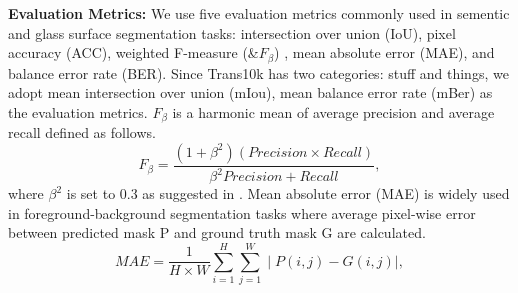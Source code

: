 \documentclass[10pt,twocolumn,letterpaper]{article}
\begin{document}
\textbf{Evaluation Metrics:}
We use five evaluation metrics commonly used in sementic and glass surface segmentation tasks: intersection over union (IoU), pixel accuracy (ACC), weighted F-measure (\&${F}_{\beta}$) \cite{margolin2014evaluate}, mean absolute error (MAE), and balance error rate (BER). Since Trans10k has two categories: stuff and things, we adopt mean intersection over union (mIou), mean balance error rate (mBer) as the evaluation metrics. 
${F}_{\beta}$ is a harmonic mean of average precision and average recall defined as follows.
\begin{equation}
\label{eqn:03}
{\textit{F}_{\beta}}=\frac{(1+{\beta^{2}})(Precision\times{Recall})}{{\beta^{2}}Precision+Recall},
\end{equation}
where $\beta^{2}$ is set to 0.3 as suggested in \cite{achanta2009frequency}.
Mean absolute error (MAE) is widely used in foreground-background segmentation tasks where average pixel-wise error between predicted mask P and ground truth mask G are calculated.
\begin{equation}
\label{eqn:03}
{\textit{MAE}}=\frac{1}{H\times{W}}\sum_{i=1}^{H}\sum_{j=1}^{W}\mid P(i,j)-G(i,j)\mid,
\end{equation}
\end{document}
